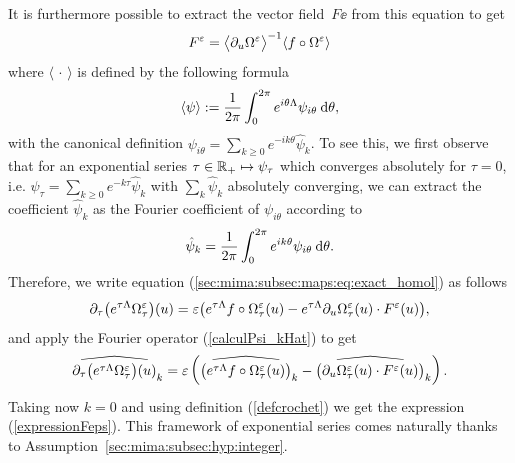 It is furthermore possible to extract the vector field~$F\ee$ from this equation to get
\begin{equation}
\label{expressionFeps}
    F^{\varepsilon} = \big\langle \partial_{u} \Omega^{\varepsilon} \big\rangle^{-1} \langle f \circ \Omega^{\varepsilon} \rangle
\end{equation}
where $\langle\, \cdot \, \rangle$ is defined by  the following formula
\begin{equation}
\label{defcrochet}
    \langle \psi \rangle := \frac{1}{2\pi} \int_0^{2\pi} e^{i\theta \Lambda} 
    \psi_{i\theta} \:\mathrm{d}\theta ,
\end{equation}
with the canonical definition $\psi_{i\theta} 
= \sum_{k \geq 0} e^{-i k \theta} \hat{\psi}_k$.  
 To see this, we first observe that for an exponential series $\tau \in \mathbb{R}_+ \mapsto \psi_{\tau}$ which converges absolutely for $\tau = 0$, 
i.e. $\psi_{\tau} = \sum_{k \geq 0} e^{-k\tau} \hat{\psi}_k$ 
with $\sum_k \hat{\psi}_k$ absolutely converging,
we can extract the coefficient $\hat{\psi}_k$ as the Fourier coefficient of  $\psi_{i\theta}$ according to
\begin{equation}
\label{calculPsi_kHat}
\hat{\psi}_k = \frac{1}{2\pi} \int_0^{2\pi} e^{i k\theta} 
    \psi_{i\theta} \:\mathrm{d}\theta .
\end{equation}
Therefore,  we write equation (\ref{sec:mima:subsec:maps:eq:exact_homol}) as follows
\begin{equation} 
    \partial_{\tau}  \big( e^{\tau \Lambda}  \Omega^{\varepsilon}_{\tau}\big) (u) = \varepsilon \big( e^{\tau \Lambda}  f \circ \Omega^{\varepsilon}_{\tau}(u)  -  e^{\tau\Lambda}  \partial_{u}\Omega^{\varepsilon}_{\tau}(u) \cdot F^{\varepsilon}(u) \big), 
\end{equation}
and apply the Fourier operator  (\ref{calculPsi_kHat}) to get
$$\widehat{\partial_{\tau}  \big( e^{\tau \Lambda}  \Omega^{\varepsilon}_{\tau}\big) (u) } _k 
= \varepsilon \left(  \widehat{\big(e^{\tau \Lambda}f \circ \Omega^{\varepsilon}_{\tau}(u)\big)}_k -   \widehat{\big(\partial_{u}\Omega^{\varepsilon}_{\tau}(u) \cdot F^{\varepsilon}(u)\big)}_k 
\right) .
$$
Taking now $k=0$ and using definition (\ref{defcrochet}) we get the expression (\ref{expressionFeps}).
This framework of exponential series comes naturally thanks to 
Assumption~\ref{sec:mima:subsec:hyp:integer}.


